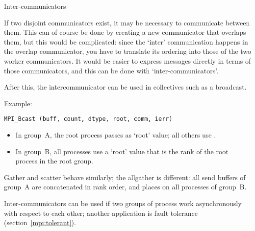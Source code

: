 
 {Inter-communicators}

If two disjoint communicators exist, it may be necessary to
communicate between them. This can of course be done by creating a new
communicator that overlaps them, but this would be complicated: since
the `inter' communication happens in the overlap communicator, you
have to translate its ordering into those of the two worker
communicators. It would be easier to express messages directly in
terms of those communicators, and this can be done with
`inter-communicators'.


After this, the intercommunicator can be used in collectives such as
a broadcast.

Example:
\begin{lstlisting}
MPI_Bcast (buff, count, dtype, root, comm, ierr)
\end{lstlisting}
\begin{itemize}
\item In group~A, the root process passes  as
  `root' value; all others use .
\item In group~B, all processes use a `root' value that is the
  rank of the root process in the root group.
\end{itemize}
Gather and scatter behave similarly; the allgather is different: all
send buffers of group~A are concatenated in rank order, and places on
all processes of group~B.

Inter-communicators can be used if two groups of process work
asynchronously with respect to each other; another application is
fault tolerance (section~\ref{mpi:tolerant}).

